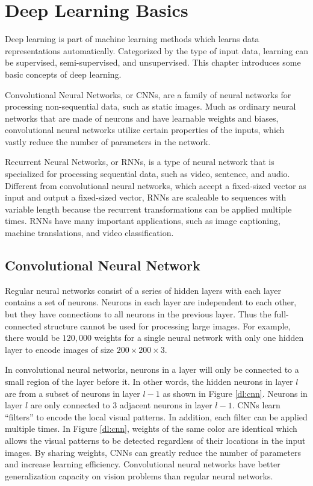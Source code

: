 \chapter{Deep Learning Basics}
\label{ch:deep-learning-basics}

Deep learning is part of machine learning methods which learns data representations automatically. Categorized by the type of input data, learning can be supervised, semi-supervised, and unsupervised. This chapter introduces some basic concepts of deep learning. 

Convolutional Neural Networks, or CNNs, are a family of neural networks for processing non-sequential data, such as static images. Much as ordinary neural networks that are made of neurons and have learnable weights and biases, convolutional neural networks utilize certain properties of the inputs, which vastly reduce the number of parameters in the network. 

Recurrent Neural Networks, or RNNs, is a type of neural network that is specialized for processing sequential data, such as video, sentence, and audio. Different from convolutional neural networks, which accept a fixed-sized vector as input and output a fixed-sized vector, RNNs are scaleable to sequences with variable length because the recurrent transformations can be applied multiple times. RNNs have many important applications, such as image captioning, machine translations, and video classification.

\section{Convolutional Neural Network} %
Regular neural networks consist of a series of hidden layers with each layer contains a set of neurons. Neurons in each layer are independent to each other, but they have connections to all neurons in the previous layer. Thus the full-connected structure cannot be used for processing large images. For example, there would be $120,000$ weights for a single neural network with only one hidden layer  to encode images of size $200\times200\times3$.

In convolutional neural networks, neurons in a layer will only be connected to a small region of the layer before it. In other words, the hidden neurons in layer $l$ are from a subset of neurons in layer $l-1$ as shown in Figure \ref{dl:cnn}. Neurons in layer $l$ are only connected to 3 adjacent neurons in layer $l-1$. CNNs learn ``filters'' to encode the local visual patterns. In addition, each filter can be applied multiple times. In Figure \ref{dl:cnn}, weights of the same color are identical which allows the visual patterns to be detected regardless of their locations in the input images. By sharing weights, CNNs can greatly reduce the number of parameters and increase learning efficiency. Convolutional neural networks have better generalization capacity on vision problems than regular neural networks.

